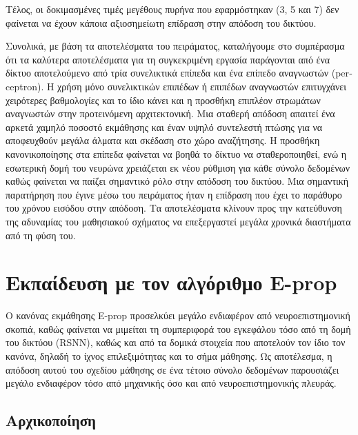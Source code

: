 \documentclass[12pt]{report}
\begin{document}
Τέλος, οι δοκιμασμένες τιμές μεγέθους πυρήνα που εφαρμόστηκαν (3, 5 και 7) δεν φαίνεται να έχουν κάποια αξιοσημείωτη επίδραση στην απόδοση του δικτύου.

Συνολικά, με βάση τα αποτελέσματα του πειράματος, καταλήγουμε στο συμπέρασμα ότι τα καλύτερα αποτελέσματα για τη συγκεκριμένη εργασία παράγονται από ένα δίκτυο αποτελούμενο από τρία συνελικτικά επίπεδα και ένα επίπεδο αναγνωστών (\textlatin{perceptron}). Η χρήση μόνο συνελικτικών επιπέδων ή επιπέδων αναγνωστών επιτυγχάνει χειρότερες βαθμολογίες και το ίδιο κάνει και η προσθήκη επιπλέον στρωμάτων αναγνωστών στην προτεινόμενη αρχιτεκτονική. Μια σταθερή απόδοση απαιτεί ένα αρκετά χαμηλό ποσοστό εκμάθησης και έναν υψηλό συντελεστή πτώσης για να αποφευχθούν μεγάλα άλματα και σκέδαση στο χώρο αναζήτησης. Η προσθήκη κανονικοποίησης στα επίπεδα φαίνεται να βοηθά το δίκτυο να σταθεροποιηθεί, ενώ η εσωτερική δομή του νευρώνα χρειάζεται εκ νέου ρύθμιση για κάθε σύνολο δεδομένων καθώς φαίνεται να παίζει σημαντικό ρόλο στην απόδοση του δικτύου. Μια σημαντική παρατήρηση που έγινε μέσω του πειράματος ήταν η επίδραση που έχει το παράθυρο του χρόνου εισόδου στην απόδοση. Τα αποτελέσματα κλίνουν προς την κατεύθυνση της αδυναμίας του μαθησιακού σχήματος να επεξεργαστεί μεγάλα χρονικά διαστήματα από τη φύση του.

\section{Εκπαίδευση με τον αλγόριθμο \textlatin{E-prop}}

Ο κανόνας εκμάθησης \textlatin{E-prop} προσελκύει μεγάλο ενδιαφέρον από νευροεπιστημονική σκοπιά, καθώς φαίνεται να μιμείται τη συμπεριφορά του εγκεφάλου τόσο από τη δομή του δικτύου (\textlatin{RSNN}), καθώς και από τα δομικά στοιχεία που αποτελούν τον ίδιο τον κανόνα, δηλαδή το ίχνος επιλεξιμότητας και το σήμα μάθησης. Ως αποτέλεσμα, η απόδοση αυτού του σχεδίου μάθησης σε ένα τέτοιο σύνολο δεδομένων παρουσιάζει μεγάλο ενδιαφέρον τόσο από μηχανικής όσο και από νευροεπιστημονικής πλευράς.

\subsection{Αρχικοποίηση}
\end{document}
